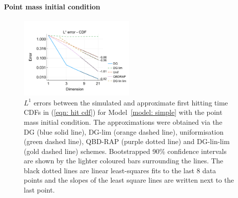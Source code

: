 \paragraph{Point mass initial condition}
\begin{figure}[h]
	\centering
	\includegraphics[width=0.5\textwidth,trim={0.75cm 0.8cm 0.25cm 1.25cm},clip]{chapter6/figs/hitting_times_model/hitting_times/point_mass/l1_cdf_error_formatted.pdf}
	\caption{\(L^1\) errors between the simulated and approximate first hitting time CDFs in (\ref{eqn: hit cdf}) for Model~\ref{model: simple} with the point mass initial condition. The approximations were obtained via the DG (blue solid line), DG-lim (orange dashed line), uniformisation (green dashed line), QBD-RAP (purple dotted line) and DG-lin-lim (gold dashed line) schemes. Bootstrapped 90\% confidence intervals are shown by the lighter coloured bars surrounding the lines. The black dotted lines are linear least-squares fits to the last 8 data points and the slopes of the least square lines are written next to the last point.} 
	\label{fig: hitting time pm} 
\end{figure}
